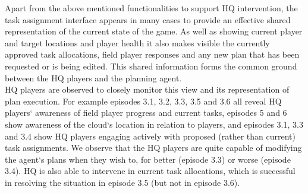 Apart from the above mentioned functionalities to support HQ intervention, the task assignment interface appears in many cases to provide an effective shared representation of the current state of the game. As well as showing current player and target locations and player health it also makes visible the currently approved task allocations, field player responses and any new plan that has been requested or is being edited. This shared information forms the common ground between the HQ players and the planning agent.\\

HQ players are observed to closely monitor this view and its representation of plan execution. For example episodes 3.1, 3.2, 3.3, 3.5 and 3.6 all reveal HQ players` awareness of field player progress and current tasks, episodes 5 and 6 show awareness of the cloud`s location in relation to players, and episodes 3.1, 3.3 and 3.4 show HQ players engaging actively with proposed (rather than current) task assignments. We observe that the HQ players are quite capable of modifying the agent`s plans when they wish to, for better (episode 3.3) or worse (episode 3.4). HQ is also able to intervene in current task allocations, which is successful in resolving the situation in episode 3.5 (but not in episode 3.6).\\




